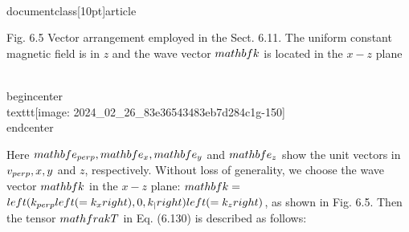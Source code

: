 \\documentclass[10pt]{article}
\begin{document}
{{{{Fig. 6.5 Vector arrangement employed in the Sect. 6.11. The uniform constant magnetic field is in $z$ and the wave vector $\\mathbf{k}$ is located in the $x-z$ plane

\\begin{center}
\\texttt{[image: 2024\_02\_26\_83e36543483eb7d284c1g-150]}
\\end{center}

Here $\\mathbf{e}_{\\perp}, \\mathbf{e}_{x}, \\mathbf{e}_{y}$ and $\\mathbf{e}_{z}$ show the unit vectors in $v_{\\perp}, x, y$ and $z$, respectively. Without loss of generality, we choose the wave vector $\\mathbf{k}$ in the $x-z$ plane: $\\mathbf{k}=$ $\\left(k_{\\perp}\\left(=k_{x}\\right), 0, k_{\\|}\\right)\\left(=k_{z}\\right)$, as shown in Fig. 6.5. Then the tensor $\\mathfrak{T}$ in Eq. (6.130) is described as follows:


}}}}
\end{document}
